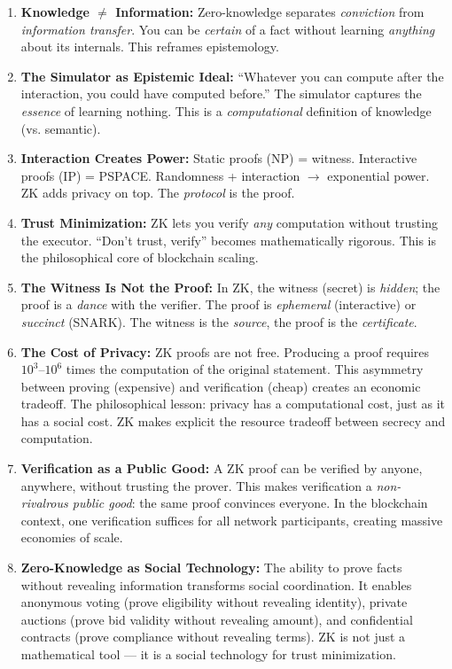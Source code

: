 \begin{enumerate}
\item \textbf{Knowledge $\neq$ Information:} Zero-knowledge separates \emph{conviction} from \emph{information transfer}. You can be \emph{certain} of a fact without learning \emph{anything} about its internals. This reframes epistemology.

\item \textbf{The Simulator as Epistemic Ideal:} ``Whatever you can compute after the interaction, you could have computed before.'' The simulator captures the \emph{essence} of learning nothing. This is a \emph{computational} definition of knowledge (vs. semantic).

\item \textbf{Interaction Creates Power:} Static proofs (NP) = witness. Interactive proofs (IP) = PSPACE. Randomness + interaction $\to$ exponential power. ZK adds privacy on top. The \emph{protocol} is the proof.

\item \textbf{Trust Minimization:} ZK lets you verify \emph{any} computation without trusting the executor. ``Don't trust, verify'' becomes mathematically rigorous. This is the philosophical core of blockchain scaling.

\item \textbf{The Witness Is Not the Proof:} In ZK, the witness (secret) is \emph{hidden}; the proof is a \emph{dance} with the verifier. The proof is \emph{ephemeral} (interactive) or \emph{succinct} (SNARK). The witness is the \emph{source}, the proof is the \emph{certificate}.

\item \textbf{The Cost of Privacy:} ZK proofs are not free. Producing a proof requires $10^3$--$10^6$ times the computation of the original statement. This asymmetry between proving (expensive) and verification (cheap) creates an economic tradeoff. The philosophical lesson: privacy has a computational cost, just as it has a social cost. ZK makes explicit the resource tradeoff between secrecy and computation.

\item \textbf{Verification as a Public Good:} A ZK proof can be verified by anyone, anywhere, without trusting the prover. This makes verification a \emph{non-rivalrous public good}: the same proof convinces everyone. In the blockchain context, one verification suffices for all network participants, creating massive economies of scale.

\item \textbf{Zero-Knowledge as Social Technology:} The ability to prove facts without revealing information transforms social coordination. It enables anonymous voting (prove eligibility without revealing identity), private auctions (prove bid validity without revealing amount), and confidential contracts (prove compliance without revealing terms). ZK is not just a mathematical tool --- it is a social technology for trust minimization.
\end{enumerate}

